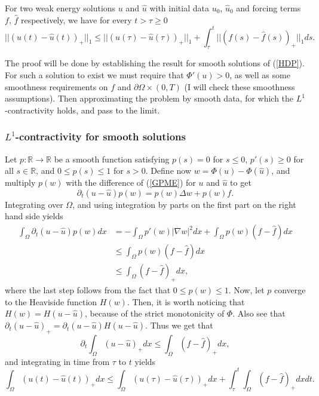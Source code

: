 \documentclass[11pt, a4paper]{article}
\begin{document}
\begin{proposition}
For two weak energy solutions $u$ and $\hat{u}$ with initial data $u_0$, $\hat{u}_0$ and forcing terms $f$, $\hat{f}$ respectively, we have for every $t > \tau \geq 0$
\begin{equation}
\label{l1_con}
||(u(t) - \hat{u}(t))_+||_1 \leq ||(u(\tau) - \hat{u}(\tau))_+||_1 + \int_\tau^t ||(f(s) - \hat{f}(s))_+||_1ds. 
\end{equation}
\end{proposition}

The proof will be done by establishing the result for smooth solutions of (\ref{HDP}). For such a solution to exist we must require that $\Phi'(u) > 0$, as well as some smoothness requirements on $f$ and $\partial\Omega \times (0,T)$ (I will check these smoothness assumptions). Then approximating the problem by smooth data, for which the $L^1$-contractivity holds, and pass to the limit.

\subsubsection{$L^1$-contractivity for smooth solutions}
Let $p: \mathbb{R} \to \mathbb{R}$ be a smooth function satisfying $p(s) = 0$ for $s \leq 0$, $p'(s) \geq 0$ for all $s\in \mathbb{R}$, and $0 \leq p(s) \leq 1$ for $s > 0$. Define now $w = \Phi(u) - \Phi(\hat{u})$, and multiply $p(w)$ with the difference of (\ref{GPME}) for $u$ and $\hat{u}$ to get
\begin{equation*}
\partial_t(u-\hat{u})p(w) = p(w)\Delta w + p(w)f.
\end{equation*}
Integrating over $\Omega$, and using integration by parts on the first part on the right hand side yields
\begin{align*}
\int_{\Omega}\partial_t(u-\hat{u})p(w)dx &= -\int_{\Omega}p'(w)|\nabla w|^2dx + \int_{\Omega}p(w)(f-\hat{f}) dx \\
	&\leq \int_{\Omega}p(w)(f-\hat{f}) dx \\
	&\leq \int_{\Omega}(f-\hat{f})_+ dx,
\end{align*}
where the last step follows from the fact that $0 \leq p(w) \leq 1$.
Now, let $p$ converge to the Heaviside function $H(w)$. Then, it is worth noticing that $H(w) = H(u-\hat{u})$, because of the strict monotonicity of $\Phi$. Also see that $\partial_t(u-\hat{u})_+ = \partial_t(u-\hat{u})H(u-\hat{u})$. Thus we get that
\begin{equation*}
\partial_t \int_{\Omega}(u-\hat{u})_+dx \leq \int_{\Omega}(f-\hat{f})_+ dx,
\end{equation*}
and integrating in time from $\tau$ to $t$ yields
\begin{equation*}
\int_{\Omega}(u(t)-\hat{u}(t))_+dx \leq \int_{\Omega}(u(\tau)-\hat{u}(\tau))_+dx + \int_\tau^t\int_{\Omega}(f-\hat{f})_+dxdt.
\end{equation*}
\end{document}
